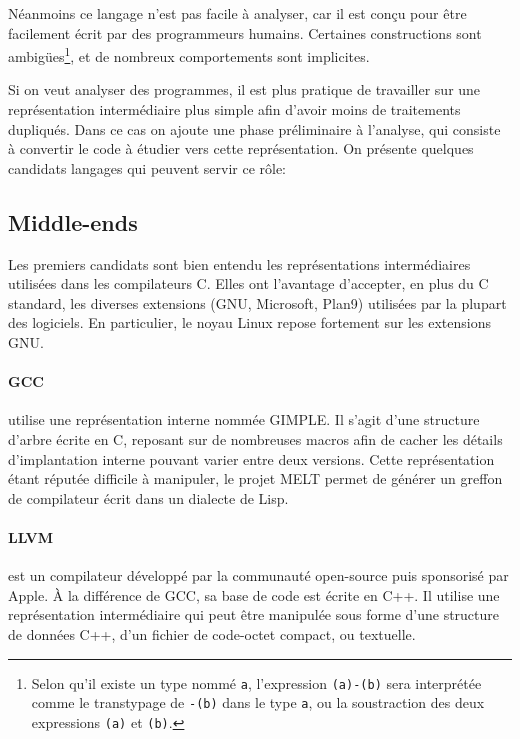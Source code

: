 Néanmoins ce langage n'est pas facile à analyser, car il est conçu pour être
facilement écrit par des programmeurs humains. Certaines constructions sont
ambigües\footnote{
    Selon qu'il existe un type nommé \texttt{a}, l'expression \texttt{(a)-(b)}
    sera interprétée comme le transtypage de \texttt{-(b)} dans le type
    \texttt{a}, ou la soustraction des deux expressions \texttt{(a)} et
    \texttt{(b)}.
}, et de nombreux comportements sont implicites.

Si on veut analyser des programmes, il est plus pratique de travailler sur une
représentation intermédiaire plus simple afin d'avoir moins de traitements
dupliqués. Dans ce cas on ajoute une phase préliminaire à l'analyse, qui
consiste à convertir le code à étudier vers cette représentation. On présente
quelques candidats langages qui peuvent servir ce rôle:

\subsection*{Middle-ends}

Les premiers candidats sont bien entendu les représentations intermédiaires
utilisées dans les compilateurs C. Elles ont l'avantage d'accepter, en plus du C
standard, les diverses extensions (GNU, Microsoft, Plan9) utilisées par la
plupart des logiciels. En particulier, le noyau Linux repose fortement sur les
extensions GNU.\@

\paragraph{GCC} utilise une représentation interne nommée
GIMPLE\cite{gcc-gimple}. Il s'agit d'une structure d'arbre écrite en C, reposant
sur de nombreuses macros afin de cacher les détails d'implantation interne
pouvant varier entre deux versions. Cette représentation étant réputée difficile
à manipuler, le projet MELT\cite{gcc-melt} permet de générer un greffon de
compilateur écrit dans un dialecte de Lisp.

\paragraph{LLVM}\cite{llvm-pres} est un compilateur développé par la communauté
open-source puis sponsorisé par Apple. À la différence de GCC, sa base de code
est écrite en C++. Il utilise une représentation intermédiaire qui peut être
manipulée sous forme d'une structure de données C++, d'un fichier de code-octet
compact, ou textuelle.

